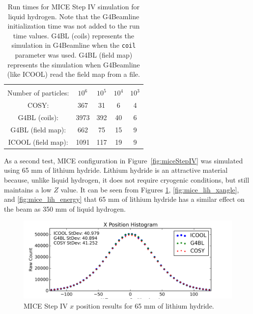 \documentclass[a4paper,11pt]{article}
\begin{document}
\begin{table}
\begin{center}
\begin{tabularx}{0.5\columnwidth}{ccccc}
\hline \hline \vspace*{-10pt} \\
Number of particles: & $10^6$ & $10^5$ & $10^4$ & $10^3$\\
\hline
COSY: & 367 & 31 & 6 & 4\\
G4BL (coils): & 3973 & 392 & 40 & 6\\
G4BL (field map): & 662 & 75 & 15 & 9\\
ICOOL (field map): & 1091 & 117 & 19 & 9\\
\hline
\end{tabularx}
\end{center}
\caption[Run times for MICE Step IV simulation.]{Run times for MICE Step IV simulation for liquid hydrogen. Note that the G4Beamline initialization time was not added to the run time values. G4BL (coils) represents the simulation in G4Beamline when the \texttt{coil} parameter was used. G4BL (field map) represents the simulation when G4Beamline (like ICOOL) read the field map from a file.}
\label{tbl:mice_times}
\end{table}

As a second test, MICE configuration in Figure~\ref{fig:miceStepIV} was simulated using 65 mm of lithium hydride. Lithium hydride is an attractive material because, unlike liquid hydrogen, it does not require cryogenic conditions, but still maintains a low $Z$ value. It can be seen from Figures \ref{fig:mice_lih_x}, \ref{fig:mice_lih_xangle}, and \ref{fig:mice_lih_energy} that 65 mm of lithium hydride has a similar effect on the beam as 350 mm of liquid hydrogen.

\begin{figure}[htb]
  \centering
    \includegraphics[width=\columnwidth]{Figures/x_LiH} 
  \caption{MICE Step IV $x$ position results for 65 mm of lithium hydride.}
  \label{fig:mice_lih_x}
\end{figure}
\end{document}
